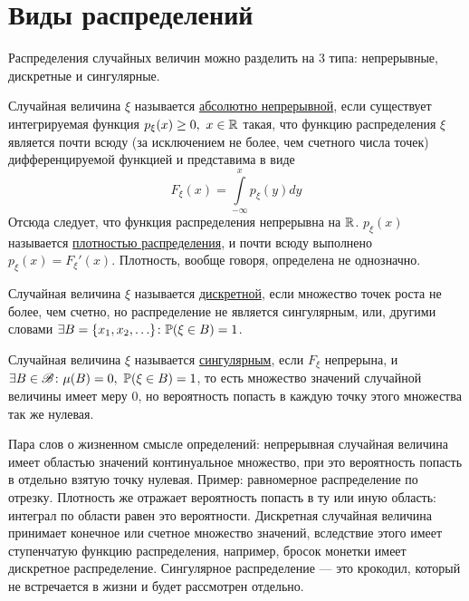 \documentclass[../TV&MS.tex]{subfiles}
\begin{document}
    
\section{Виды распределений}

Распределения случайных величин можно разделить на 3 типа: непрерывные, дискретные и сингулярные.

\begin{Def}
	Случайная величина $\xi$ называется \underline{абсолютно непрерывной}, если существует интегрируемая функция $p_\xi(x) \ge 0, \ x \in \mathbb{R}$ такая, что
	функцию распределения $\xi$ является почти всюду (за исключением не более, чем счетного числа точек) дифференцируемой функцией и представима в виде
	$$F_\xi(x) = \int\limits_{-\infty}^x p_\xi(y)dy$$
	Отсюда следует, что функция распределения непрерывна на $\mathbb{R}$. $p_\xi(x)$ называется \underline{плотностью распределения},
	и почти всюду выполнено $p_\xi(x)=F_\xi'(x)$.
	Плотность, вообще говоря, определена не однозначно.
\end{Def}

\begin{Def}
	Случайная величина $\xi$ называется \underline{дискретной}, если множество точек роста не более, чем счетно, но распределение не является сингулярным, или, 
	другими словами $\exists B = \{x_1, x_2, \ldots\} \colon \mathbb{P}(\xi \in B) = 1$.
\end{Def}

\begin{Def}
	Случайная величина $\xi$  называется \underline{сингулярным}, если $F_\xi$ непрерына, и $\exists B \in \mathscr{B} \colon \mu(B) = 0, \ \mathbb{P}(\xi \in B) = 1$, то есть множество значений случайной величины имеет меру 0, но вероятность попасть в каждую точку этого множества так же нулевая.
\end{Def}

Пара слов о жизненном смысле определений: непрерывная случайная величина имеет областью значений континуальное множество, при это вероятность попасть в отдельно взятую точку нулевая. Пример: равномерное распределение по отрезку. Плотность же отражает вероятность попасть в ту или иную область: интеграл по области равен это вероятности. Дискретная случайная величина принимает конечное или счетное множество значений, вследствие этого имеет ступенчатую функцию распределения, например, бросок монетки имеет дискретное распределение. Сингулярное распределение --- это крокодил, который 
не встречается в жизни и будет рассмотрен отдельно.
\end{document}
